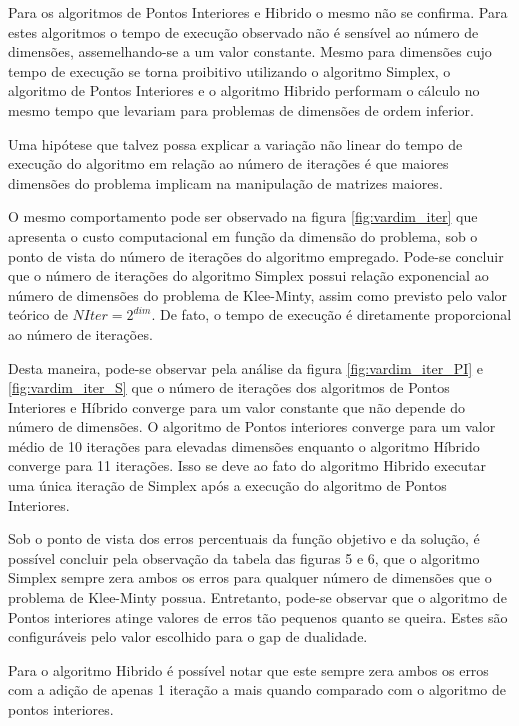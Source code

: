 \documentclass[11pt,a4paper]{article}
\begin{document}
            Para os algoritmos de Pontos Interiores e Hibrido o mesmo não se confirma. Para estes algoritmos o tempo de execução observado não é sensível ao número de dimensões, assemelhando-se a um valor constante. Mesmo para dimensões cujo tempo de execução se torna proibitivo utilizando o algoritmo Simplex, o algoritmo de Pontos Interiores e o algoritmo Hibrido performam o cálculo no mesmo tempo que levariam para problemas de dimensões de ordem inferior.

            Uma hipótese que talvez possa explicar a variação não linear do tempo de execução do algoritmo em relação ao número de iterações é que maiores dimensões do problema implicam na manipulação de matrizes maiores. 
            
            O mesmo comportamento pode ser observado na figura \ref{fig:vardim_iter} que apresenta o custo computacional em função da dimensão do problema, sob o ponto de vista do número de iterações do algoritmo empregado. Pode-se concluir que o número de iterações do algoritmo Simplex possui relação exponencial ao número de dimensões do problema de Klee-Minty, assim como previsto pelo valor teórico de $N Iter = 2 ^{dim}$. De fato, o tempo de execução é diretamente proporcional ao número de iterações.

            Desta maneira, pode-se observar pela análise da figura \ref{fig:vardim_iter_PI} e \ref{fig:vardim_iter_S} que o número de iterações dos algoritmos de Pontos Interiores e Híbrido converge para um valor constante que não depende do número de dimensões. O algoritmo de Pontos interiores converge para um valor médio de 10 iterações para elevadas dimensões enquanto o algoritmo Híbrido converge para 11 iterações. Isso se deve ao fato do algoritmo Hibrido executar uma única iteração de Simplex após a execução do algoritmo de Pontos Interiores.

            Sob o ponto de vista dos erros percentuais da função objetivo e da solução, é possível concluir pela observação da tabela das figuras 5 e 6, que o algoritmo Simplex sempre zera ambos os erros para qualquer número de dimensões que o problema de Klee-Minty possua. Entretanto, pode-se observar que o algoritmo de Pontos interiores atinge valores de erros tão pequenos quanto se queira. Estes são configuráveis pelo valor escolhido para o gap de dualidade. 

            Para o algoritmo Hibrido é possível notar que este sempre zera ambos os erros com a adição de apenas 1 iteração a mais quando comparado com o algoritmo de pontos interiores.
\end{document}
